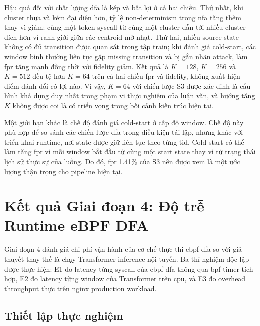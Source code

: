 \documentclass[../main.tex]{subfiles}
\begin{document}
Hậu quả đối với chất lượng \gls{dfa} là kép và bất lợi ở cả hai chiều.
Thứ nhất, khi cluster thưa và kém đại diện hơn, tỷ lệ non-determinism
trong \gls{nfa} tăng thêm thay vì giảm: cùng một token \gls{syscall} từ cùng một
cluster dẫn tới nhiều cluster đích hơn vì ranh giới giữa các centroid
mờ nhạt. Thứ hai, nhiều source state không có đủ transition được quan
sát trong tập train; khi đánh giá cold-start, các window bình thường
liên tục gặp missing transition và bị gắn nhãn attack, làm \gls{fpr} tăng
mạnh đồng thời với fidelity giảm. Kết quả là $K = 128$, $K = 256$ và
$K = 512$ đều tệ hơn $K = 64$ trên cả hai chiều \gls{fpr} và fidelity,
không xuất hiện điểm đánh đổi có lợi nào. Vì vậy, $K = 64$ với chiến
lược S3 được xác định là cấu hình khả dụng duy nhất trong phạm vi
thực nghiệm của luận văn, và hướng tăng $K$ không được coi là có
triển vọng trong bối cảnh kiến trúc hiện tại.

Một giới hạn khác là chế độ đánh giá cold-start ở cấp độ window. Chế
độ này phù hợp để
so sánh các chiến lược \gls{dfa} trong điều kiện tái lập, nhưng khác với
triển khai runtime,
nơi state được giữ liên tục theo từng \gls{tid}. Cold-start có thể làm tăng
\gls{fpr} vì mỗi window
bắt đầu từ cùng một start state thay vì từ trạng thái lịch sử thực sự
của luồng. Do đó,
\gls{fpr} 1.41\% của S3 nên được xem là một ước lượng thận trọng cho
pipeline hiện tại.

\section{Kết quả Giai đoạn 4: Độ trễ Runtime eBPF DFA}
\label{sec:p4_results}

Giai đoạn 4 đánh giá chi phí vận hành của cơ chế thực thi \gls{ebpf} \gls{dfa} so
với giả thuyết thay thế là chạy Transformer inference nội tuyến. Ba thí
nghiệm độc lập được thực hiện: E1 đo latency từng \gls{syscall} của \gls{ebpf} \gls{dfa}
thông qua \gls{bpf} timer tích hợp, E2 đo latency từng window của Transformer
trên \gls{cpu}, và E3 đo overhead throughput thực trên nginx production
workload.

\subsection{Thiết lập thực nghiệm}
\label{subsec:p4_setup}
\end{document}
